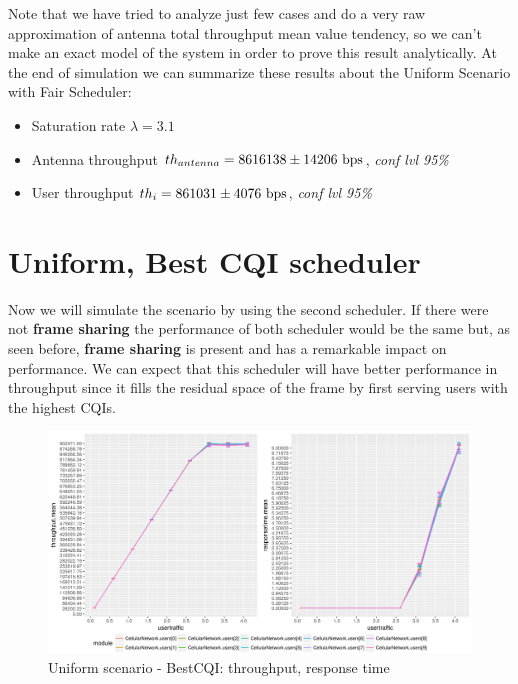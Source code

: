 Note that we have tried to analyze just few cases and do a very raw approximation of antenna total throughput mean value tendency, so we can't make an exact model of the system in order to prove this result analytically.
At the end of simulation we can summarize these results about the Uniform Scenario with Fair Scheduler:
\begin{itemize}
	\item Saturation rate \(\lambda = 3.1\)
	\item Antenna throughput \(th_{antenna} = 8616138 \pm 14206 \textnormal{ bps}\), \textit{conf lvl 95\%}
	\item User throughput \(th_{i} = 861031 \pm 4076 \textnormal{ bps}\), \textit{conf lvl 95\%}
\end{itemize} 

\section{Uniform, Best CQI scheduler}
Now we will simulate the scenario by using the second scheduler. If there were not \textbf{frame sharing} the performance of both scheduler would be the same but, as seen before, \textbf{frame sharing} is present and has a remarkable impact on performance. We can expect that this scheduler will have better performance in throughput since it fills the residual space of the frame by first serving users with the highest CQIs.
\begin{figure}[H]
  \includegraphics[width=1\textwidth]{images/all-unifbest}
   \caption{Uniform scenario - BestCQI: throughput, response time}
  \label{fig:Uniform scenario - BestCQI: throughput, response time}
\end{figure}

